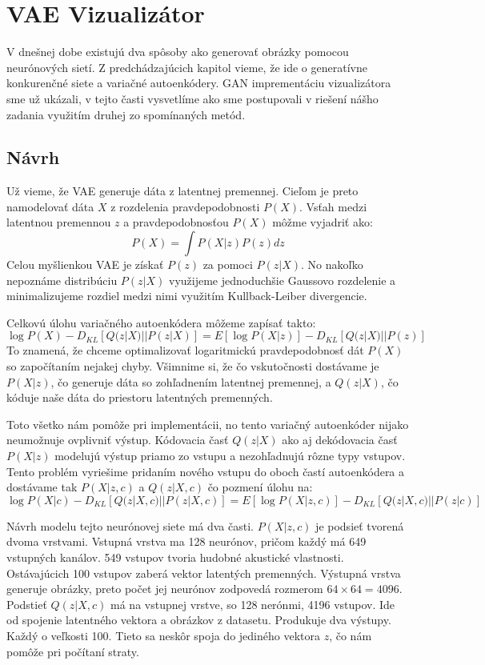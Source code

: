 \chapter{VAE Vizualizátor}
\label{vae}

V dnešnej dobe existujú dva spôsoby ako generovať obrázky pomocou neurónových sietí.
Z predchádzajúcich kapitol vieme, že ide o generatívne konkurenčné siete a variačné autoenkódery.
GAN imprementáciu vizualizátora sme už ukázali, v tejto časti vysvetlíme ako sme postupovali v riešení nášho zadania využitím druhej zo spomínaných metód.

\section{Návrh}
Už vieme, že VAE generuje dáta z latentnej premennej.
Cieľom je preto namodelovať dáta \(X\) z rozdelenia pravdepodobnosti \(P(X)\).
Vsťah medzi latentnou premennou \(z\) a pravdepodobnosťou \(P(X)\) môžme vyjadriť ako: \[P(X) = \int P(X|z)P(z)dz\]
Celou myšlienkou VAE je získať \(P(z)\) za pomoci \(P(z|X)\).
No nakoľko nepoznáme distribúciu \(P(z|X)\) využijeme jednoduchšie Gaussovo rozdelenie a minimalizujeme rozdiel medzi nimi využitím Kullback-Leiber divergencie.

Celkovú úlohu variačného autoenkódera môžeme zapísať takto: \[\log P(X) - D_{KL}[Q(z|X)||P(z|X)] = E[\log P(X|z)] - D_{KL} [Q(z|X)||P(z)]\]
To znamená, že chceme optimalizovať logaritmickú pravdepodobnosť dát \(P(X)\) so započítaním nejakej chyby.
Všimnime si, že čo vskutočnosti dostávame je \(P(X|z)\), čo generuje dáta so zohľadnením latentnej premennej, a \(Q(z|X)\), čo kóduje naše dáta do priestoru latentných premenných.

Toto všetko nám pomôže pri implementácii, no tento variačný autoenkóder nijako neumožnuje ovplivniť výstup.
Kódovacia časť \(Q(z|X)\) ako aj dekódovacia časť \(P(X|z)\) modelujú výstup priamo zo vstupu a nezohľadnujú rôzne typy vstupov.
Tento problém vyriešime pridaním nového vstupu do oboch častí autoenkódera a dostávame tak \(P(X|z,c)\) a \(Q(z|X,c)\) čo pozmení úlohu na:
\[\log P(X|c) - D_{KL}[Q(z|X,c)||P(z|X,c)] = E[\log P(X|z,c)] - D_{KL} [Q(z|X,c)||P(z|c)]\]

Návrh modelu tejto neurónovej siete má dva časti.
\(P(X|z,c)\) je podsieť tvorená dvoma vrstvami.
Vstupná vrstva ma 128 neurónov, pričom každý má 649 vstupných kanálov.
549 vstupov tvoria hudobné akustické vlastnosti.
Ostávajúcich 100 vstupov zaberá vektor latentých premenných.
Výstupná vrstva generuje obrázky, preto počet jej neurónov zodpovedá rozmerom \(64\times64 = 4096\).
Podstieť \(Q(z|X,c)\) má na vstupnej vrstve, so 128 nerónmi, 4196 vstupov.
Ide od spojenie latentného vektora a obrázkov z datasetu.
Produkuje dva výstupy.
Každý o veľkosti 100.
Tieto sa neskôr spoja do jediného vektora \(z\), čo nám pomôže pri počítaní straty.

